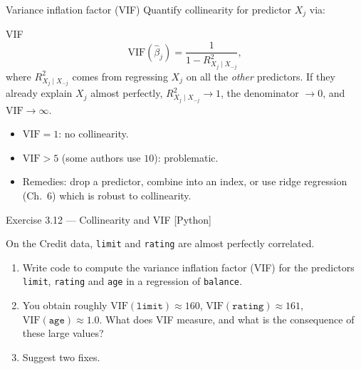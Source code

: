 \documentclass[aspectratio=169,11pt]{beamer}
\begin{document}
\begin{frame}{Variance inflation factor (VIF)}
  Quantify collinearity for predictor $X_j$ via:
  \begin{block}{VIF}
    \[
      \mathrm{VIF}(\hat\beta_j) = \frac{1}{1 - R^2_{X_j \mid X_{-j}}},
    \]
    where $R^2_{X_j \mid X_{-j}}$ comes from regressing $X_j$ on all the
    \emph{other} predictors. If they already explain $X_j$ almost
    perfectly, $R^2_{X_j \mid X_{-j}}\to 1$, the denominator $\to 0$, and
    $\mathrm{VIF}\to\infty$.
  \end{block}
  \begin{readme}
    \begin{itemize}
      \item $\mathrm{VIF} = 1$: no collinearity.
      \item $\mathrm{VIF} > 5$ (some authors use $10$): problematic.
      \item Remedies: drop a predictor, combine into an index, or use
            ridge regression (Ch.~6) which is robust to collinearity.
    \end{itemize}
  \end{readme}
\end{frame}


\begin{frame}[fragile]{Exercise 3.12 --- Collinearity and VIF [Python]}
  \begin{exercise}
    On the Credit data, \texttt{limit} and \texttt{rating} are almost
    perfectly correlated.
    \begin{enumerate}
      \item Write code to compute the variance inflation factor (VIF)
            for the predictors \texttt{limit}, \texttt{rating} and
            \texttt{age} in a regression of \texttt{balance}.
      \item You obtain roughly $\mathrm{VIF}(\texttt{limit})\approx 160$,
            $\mathrm{VIF}(\texttt{rating})\approx 161$,
            $\mathrm{VIF}(\texttt{age})\approx 1.0$. What does VIF
            measure, and what is the consequence of these large values?
      \item Suggest two fixes.
    \end{enumerate}
  \end{exercise}
\end{frame}
\end{document}
